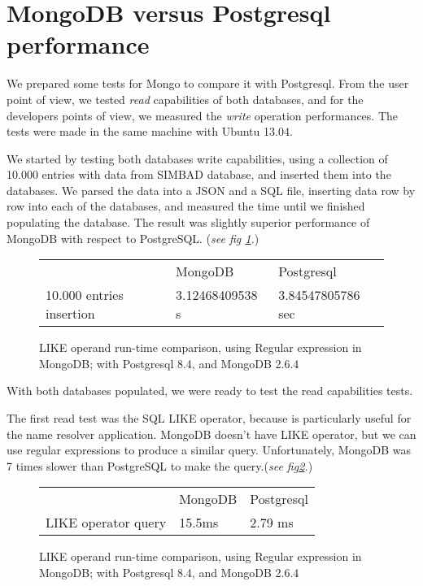 \documentclass[11pt,twoside]{article}
\begin{document}
\section{MongoDB versus Postgresql performance}
    We prepared some tests for Mongo to compare it with Postgresql. From the user
    point of view, we tested \emph{read} capabilities of both databases, and
    for the developers points of view, we measured the \emph{write} operation
    performances. The tests were made in the same machine with Ubuntu 13.04.
    
    We started by testing both databases write capabilities, using a collection of 10.000 entries with data from SIMBAD database,
    and inserted them into the databases. We parsed the data into a JSON and a SQL file, 
    inserting data row by row into each of the databases, and measured the time until we 
    finished populating the database. The result was slightly superior
    performance of MongoDB with respect to PostgreSQL. (\emph{see fig \ref{fig:insert}.})
    
 \begin{figure}
    \centering
    \begin{tabular}{lll}    
                        & MongoDB & Postgresql \\
    10.000 entries insertion & 3.12468409538 s  & 3.84547805786 sec
    \end{tabular}
    \caption{LIKE operand run-time comparison, using Regular expression in MongoDB; with Postgresql 8.4, and MongoDB 2.6.4}
    \label{fig:insert}
\end{figure}   
    
    With both databases populated, we were ready to test the read capabilities tests.
    
    The first read test was the SQL LIKE operator, because is particularly
    useful for the name resolver application. 
    MongoDB doesn't have LIKE operator, but we can use regular expressions to
    produce a similar query. Unfortunately, MongoDB was 7 times slower than
    PostgreSQL to make the query.(\emph{see fig\ref{fig:like}.})
\begin{figure}
    \centering
    \begin{tabular}{lll}    
                        & MongoDB & Postgresql \\
    LIKE operator query & 15.5ms  & 2.79 ms
    \end{tabular}
    \caption{LIKE operand run-time comparison, using Regular expression in MongoDB; with Postgresql 8.4, and MongoDB 2.6.4}
    \label{fig:like}
\end{figure}
\end{document}
